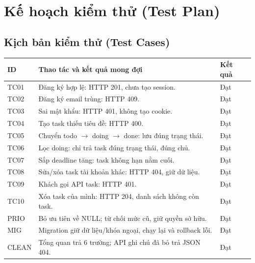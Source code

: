 \section{Kế hoạch kiểm thử (Test Plan)}

\subsection{Kịch bản kiểm thử (Test Cases)}
\begin{center}
\small
\begin{tabular}{@{}lp{8.6cm}l@{}}
\toprule
\textbf{ID} & \textbf{Thao tác và kết quả mong đợi} & \textbf{Kết quả} \\
\midrule
TC01 & Đăng ký hợp lệ: HTTP 201, chưa tạo session. & Đạt \\
TC02 & Đăng ký email trùng: HTTP 409. & Đạt \\
TC03 & Sai mật khẩu: HTTP 401, không tạo cookie. & Đạt \\
TC04 & Tạo task thiếu tiêu đề: HTTP 400. & Đạt \\
TC05 & Chuyển todo $\to$ doing $\to$ done: lưu đúng trạng thái. & Đạt \\
TC06 & Lọc doing: chỉ trả task đúng trạng thái, đúng chủ. & Đạt \\
TC07 & Sắp deadline tăng: task không hạn nằm cuối. & Đạt \\
TC08 & Sửa/xóa task tài khoản khác: HTTP 404, giữ dữ liệu. & Đạt \\
TC09 & Khách gọi API task: HTTP 401. & Đạt \\
TC10 & Xóa task của mình: HTTP 204, danh sách không còn task. & Đạt \\
PRIO & Bỏ ưu tiên về NULL; từ chối mức cũ, giữ quyền sở hữu. & Đạt \\
MIG & Migration giữ dữ liệu/khóa ngoại, chạy lại và rollback lỗi. & Đạt \\
CLEAN & Tổng quan trả 6 trường; API ghi chú đã bỏ trả JSON 404. & Đạt \\
\bottomrule
\end{tabular}
\end{center}

